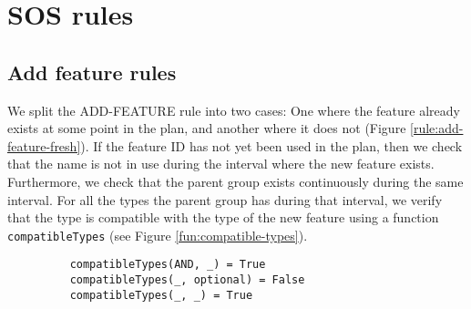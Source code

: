 \section{SOS rules}
\label{sec:sos-rules}


\subsection{Add feature rules}
We split the ADD-FEATURE rule into two cases: One where the feature already exists at some point in the plan, and another where it does not (Figure \vref{rule:add-feature-fresh}). If the feature ID has not yet been used in the plan, then we check that the name is not in use during the interval where the new feature exists. Furthermore, we check that the parent group exists continuously during the same interval. For all the types the parent group has during that interval, we verify that the type is compatible with the type of the new feature using a function \texttt{compatibleTypes} (see Figure \vref{fun:compatible-types}). 

\begin{figure}[h]
  \begin{verbatim}
    compatibleTypes(AND, _) = True
    compatibleTypes(_, optional) = False
    compatibleTypes(_, _) = True
  \end{verbatim}
  \caption{\label{fun:compatible-types}}
\end{figure}

